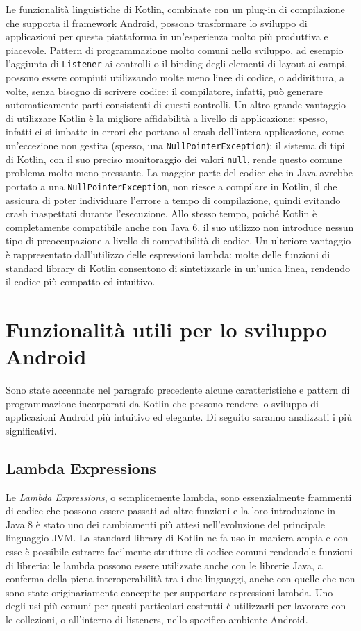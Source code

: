 Le funzionalità linguistiche di Kotlin, combinate con un plug-in di compilazione che supporta il framework Android, possono trasformare lo sviluppo di applicazioni per questa piattaforma in un'esperienza molto più produttiva e piacevole. Pattern di programmazione molto comuni nello sviluppo, ad esempio l'aggiunta di \texttt{Listener} ai controlli o il binding degli elementi di layout ai campi, possono essere compiuti utilizzando molte meno linee di codice, o addirittura, a volte, senza bisogno di scrivere codice: il compilatore, infatti, può generare automaticamente parti consistenti di questi controlli. Un altro grande vantaggio di utilizzare Kotlin è la migliore affidabilità a livello di applicazione: spesso, infatti ci si imbatte in errori che portano al crash dell’intera applicazione, come un'eccezione non gestita (spesso, una \texttt{NullPointerException}); il sistema di tipi di Kotlin, con il suo preciso monitoraggio dei valori \texttt{null}, rende questo comune problema molto meno pressante. La maggior parte del codice che in Java avrebbe portato a una \texttt{NullPointerException}, non riesce a compilare in Kotlin, il che assicura di poter individuare l'errore a tempo di compilazione, quindi evitando crash inaspettati durante l’esecuzione. Allo stesso tempo, poiché Kotlin è completamente compatibile anche con Java 6, il suo utilizzo non introduce nessun tipo di preoccupazione a livello di compatibilità di codice. Un ulteriore vantaggio è rappresentato dall’utilizzo delle espressioni lambda: molte delle funzioni di standard library di Kotlin consentono di sintetizzarle in un’unica linea, rendendo il codice più compatto ed intuitivo.\\

\section{Funzionalità utili per lo sviluppo Android}
Sono state accennate nel paragrafo precedente alcune caratteristiche e pattern di programmazione incorporati da Kotlin che possono rendere lo sviluppo di applicazioni Android più intuitivo ed elegante. Di seguito saranno analizzati i più significativi.\\

\subsection{Lambda Expressions}
Le {\em Lambda Expressions}, o semplicemente lambda, sono essenzialmente frammenti di codice che possono essere passati ad altre funzioni e la loro introduzione in Java 8 è stato uno dei cambiamenti più attesi nell'evoluzione del principale linguaggio JVM. La standard library di Kotlin ne fa uso in maniera ampia e con esse è possibile estrarre facilmente strutture di codice comuni rendendole funzioni di libreria: le lambda possono essere utilizzate anche con le librerie Java, a conferma della piena interoperabilità tra i due linguaggi, anche con quelle che non sono state originariamente concepite per supportare espressioni lambda. Uno degli usi più comuni per questi particolari costrutti è utilizzarli per lavorare con le collezioni, o all'interno di listeners, nello specifico ambiente Android.\\

